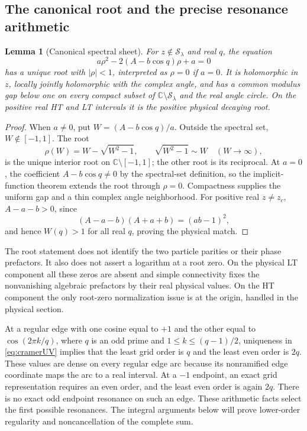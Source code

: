 \documentclass[11pt]{article}
\numberwithin{equation}{section}
\newtheorem{lemma}[theorem]{Lemma}
\theoremstyle{definition}
\newcommand{\C}{\mathbb C}
\newcommand{\cS}{\mathcal S}
\begin{document}
\subsection{The canonical root and the precise resonance arithmetic}

\begin{lemma}[Canonical spectral sheet]\label{lem:canonicalroot}
For \(z\notin\cS_\lambda\) and real \(q\), the equation
\[
 a\rho^2-2(A-b\cos q)\rho+a=0
\]
has a unique root with \(|\rho|<1\), interpreted as \(\rho=0\) if
\(a=0\). It is holomorphic in \(z\), locally jointly holomorphic
with the complex angle, and has a common modulus gap below one on
every compact subset of \(\C\setminus\cS_\lambda\) and the real
angle circle. On the positive real HT and LT intervals it is the
positive physical decaying root.
\end{lemma}
\begin{proof}
When \(a\ne0\), put \(W=(A-b\cos q)/a\). Outside the spectral set,
\(W\notin[-1,1]\). The root
\[
 \rho(W)=W-\sqrt{W^2-1},\qquad \sqrt{W^2-1}\sim W\quad(W\to\infty),
\]
is the unique interior root on \(\C\setminus[-1,1]\); the other root
is its reciprocal. At \(a=0\), the coefficient \(A-b\cos q\ne0\)
by the spectral-set definition, so the implicit-function theorem
extends the root through \(\rho=0\). Compactness supplies the uniform
gap and a thin complex angle neighborhood. For positive real
\(z\ne z_c\), \(A-a-b>0\), since
\[
 (A-a-b)(A+a+b)=(ab-1)^2,
\]
and hence \(W(q)>1\) for all real \(q\), proving the physical match.
\end{proof}

The root statement does not identify the two particle parities or
their phase prefactors. It also does not assert a logarithm at a root
zero. On the physical LT component all these zeros are absent and
simple connectivity fixes the nonvanishing algebraic prefactors by
their real physical values. On the HT component the only root-zero
normalization issue is at the origin, handled in the physical section.

At a regular edge with one cosine equal to \(+1\) and the other
equal to \(\cos(2\pi k/q)\), where \(q\) is an odd prime and
\(1\le k\le(q-1)/2\), uniqueness in \eqref{eq:cramerUV} implies that
the least grid order is \(q\) and the least even order is \(2q\).
These values are dense on every regular edge arc because its
nonramified edge coordinate maps the arc to a real interval. At a
\(-1\) endpoint, an exact grid representation requires an even
order, and the least even order is again \(2q\). There is no exact
odd endpoint resonance on such an edge. These arithmetic facts select the first possible resonances. The integral
arguments below will prove lower-order regularity and noncancellation
of the complete sum.
\end{document}
